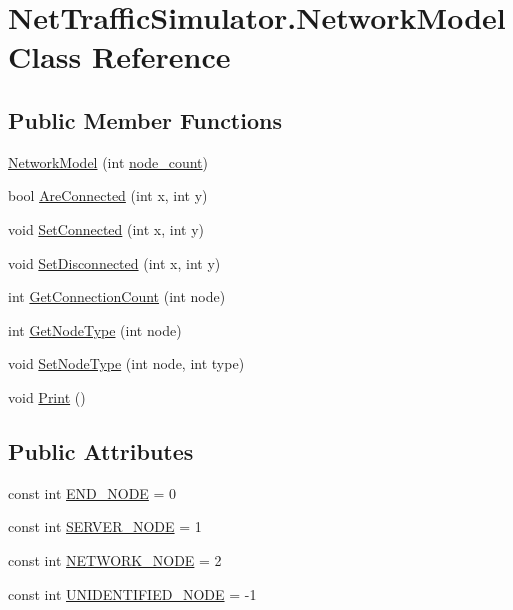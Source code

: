 \hypertarget{classNetTrafficSimulator_1_1NetworkModel}{\section{Net\-Traffic\-Simulator.\-Network\-Model Class Reference}
\label{classNetTrafficSimulator_1_1NetworkModel}
}
\subsection*{Public Member Functions}
\begin{DoxyCompactItemize}
\item 
\hyperlink{classNetTrafficSimulator_1_1NetworkModel_a271752106d40e56f0f55def7f0e1bf0d}{Network\-Model} (int \hyperlink{classNetTrafficSimulator_1_1NetworkModel_a85f9941bb3af088bd078b273f0cb4e52}{node\-\_\-count})
\item 
bool \hyperlink{classNetTrafficSimulator_1_1NetworkModel_a5d2d13396e4df9e45146b8a7f02a9b67}{Are\-Connected} (int x, int y)
\item 
void \hyperlink{classNetTrafficSimulator_1_1NetworkModel_a9b2e702172bb308e9882de6e1f22e9f1}{Set\-Connected} (int x, int y)
\item 
void \hyperlink{classNetTrafficSimulator_1_1NetworkModel_acf61bc6091630b26455868a2575d34c7}{Set\-Disconnected} (int x, int y)
\item 
int \hyperlink{classNetTrafficSimulator_1_1NetworkModel_ae32e3d246753b51152124af9df9372ee}{Get\-Connection\-Count} (int node)
\item 
int \hyperlink{classNetTrafficSimulator_1_1NetworkModel_a3d8f3112c2cc4b21fe8070a0896652fa}{Get\-Node\-Type} (int node)
\item 
void \hyperlink{classNetTrafficSimulator_1_1NetworkModel_ac8457d8aa77448caa2212020f48eec20}{Set\-Node\-Type} (int node, int type)
\item 
void \hyperlink{classNetTrafficSimulator_1_1NetworkModel_a724d036cf0dbadefaba005aa853630be}{Print} ()
\end{DoxyCompactItemize}
\subsection*{Public Attributes}
\begin{DoxyCompactItemize}
\item 
const int \hyperlink{classNetTrafficSimulator_1_1NetworkModel_a1335e5ee160345ac2f849998d94f2934}{E\-N\-D\-\_\-\-N\-O\-D\-E} = 0
\item 
const int \hyperlink{classNetTrafficSimulator_1_1NetworkModel_a9f536ecef65ce9ef55b52afa90ae8438}{S\-E\-R\-V\-E\-R\-\_\-\-N\-O\-D\-E} = 1
\item 
const int \hyperlink{classNetTrafficSimulator_1_1NetworkModel_ab2882fa4fe981780f78f822b12677f88}{N\-E\-T\-W\-O\-R\-K\-\_\-\-N\-O\-D\-E} = 2
\item 
const int \hyperlink{classNetTrafficSimulator_1_1NetworkModel_a6736303b5919398aef63238c6436fe9c}{U\-N\-I\-D\-E\-N\-T\-I\-F\-I\-E\-D\-\_\-\-N\-O\-D\-E} = -\/1
\end{DoxyCompactItemize}
